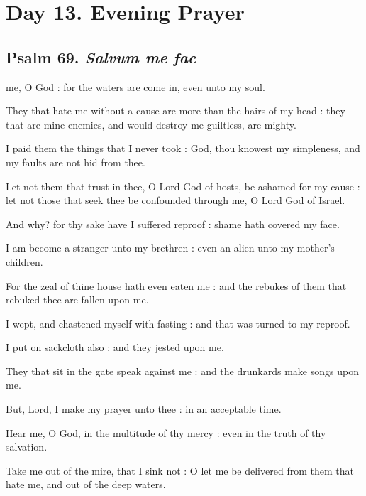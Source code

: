 \section*{Day 13. Evening Prayer}

\subsection{Psalm 69. \textit{Salvum me fac}}

 me, O God : for the waters are come in, even unto my soul.\par
{}
They that hate me without a cause are more than the hairs of my head : they that are mine enemies, and would destroy me guiltless, are mighty.\par
{}I paid them the things that I never took : God, thou knowest my simpleness, and my faults are not hid from thee.\par
{}Let not them that trust in thee, O Lord God of hosts, be ashamed for my cause : let not those that seek thee be confounded through me, O Lord God of Israel.\par
{}And why? for thy sake have I suffered reproof : shame hath covered my face.\par
{}I am become a stranger unto my brethren : even an alien unto my mother's children.\par
{}For the zeal of thine house hath even eaten me : and the rebukes of them that rebuked thee are fallen upon me.\par
{}I wept, and chastened myself with fasting : and that was turned to my reproof.\par
{}I put on sackcloth also : and they jested upon me.\par
{}They that sit in the gate speak against me : and the drunkards make songs upon me.\par
{}But, Lord, I make my prayer unto thee : in an acceptable time.\par
{}Hear me, O God, in the multitude of thy mercy : even in the truth of thy salvation.\par
{}Take me out of the mire, that I sink not : O let me be delivered from them that hate me, and out of the deep waters.\par
